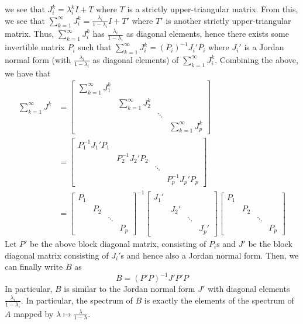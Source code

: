 \documentclass[../Thesis.tex]{subfiles}
\begin{document}
we see that $J_i^k = \lambda_i^k I + T$ where $T$ is a strictly upper-triangular matrix. From this, we see that $\sum_{k = 1}^{\infty} J_i^k = \frac{\lambda_i}{1 - \lambda_i} I + T'$ where $T'$ is another strictly upper-triangular matrix. Thus, $\sum_{k = 1}^{\infty} J_i^k$ has $\frac{\lambda_i}{1 - \lambda_i}$ as diagonal elements, hence there exists some invertible matrix $P_i$ such that $ \sum_{k = 1}^{\infty} J_i^k = \left(P_i\right)^{-1} J_i'  P_i$ where $J_i'$ is a Jordan normal form (with $\frac{\lambda_i}{1 - \lambda_i}$ as diagonal elements) of $\sum_{k = 1}^{\infty} J_i^k$. Combining the above, we have that
\begin{align*}
    \sum_{k=1}^{\infty} J^k &= \begin{bmatrix}
        \sum_{k = 1}^{\infty} J_1^k & & & \\
        & \sum_{k = 1}^{\infty} J_2^k & & \\
        & & \ddots & \\
        & & & \sum_{k= 1}^{\infty} J_p^k
    \end{bmatrix}\\
    & =  \begin{bmatrix}
        P_1^{-1} J_1' P_1 & & & \\
        & P_2^{-1} J_2' P_2 & & \\
        & & \ddots & \\
        & & & P_p^{-1} J_p' P_p
    \end{bmatrix}\\
    & = \begin{bmatrix}
        P_1 & & & \\
        & P_2 & & \\
        & & \ddots & \\
        & & & P_p
    \end{bmatrix}^{-1}
    \begin{bmatrix}
        J_1' & & & \\
        & J_2' & & \\
        & & \ddots & \\
        & & & J_p'
    \end{bmatrix}
    \begin{bmatrix}
        P_1 & & & \\
        & P_2 & & \\
        & & \ddots & \\
        & & & P_p
    \end{bmatrix}
\end{align*}
Let $P'$ be the above block diagonal matrix, consisting of $P_i$s and $J'$ be the block diagonal matrix consisting of $J_i'$s and hence also a Jordan normal form. Then, we can finally write $B$ as
$$B = \left(P' P\right)^{-1} J' P' P$$
In particular, $B$ is similar to the Jordan normal form $J'$ with diagonal elements $\frac{\lambda_i}{1-\lambda_i}$. In particular, the spectrum of $B$ is exactly the elements of the spectrum of $A$ mapped by $\lambda \mapsto \frac{\lambda}{1 - \lambda}$.
\end{document}
